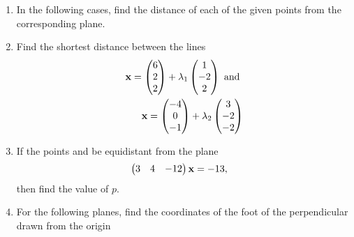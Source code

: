 \documentclass[journal,12pt,twocolumn]{IEEEtran}
\renewcommand\thesection{\arabic{section}}
\begin{document}
\begin{enumerate}[label=\thesection.\arabic*.,ref=\thesection.\theenumi]
\item In the following cases, find the distance of each of the given points from the corresponding plane.
\begin{table}[!h]
\centering
%
\caption{}
\label{table:3d}
\end{table}
\item Find the shortest distance between the lines 
%
\begin{align}
\mathbf{x} = \begin{pmatrix}6 \\ 2 \\ 2\end{pmatrix} + \lambda_1 \begin{pmatrix}1 \\ -2 \\ 2\end{pmatrix}  \text{ and }
\\
\mathbf{x} = \begin{pmatrix}-4 \\ 0 \\ -1\end{pmatrix} + \lambda_2 \begin{pmatrix}3 \\ -2 \\ -2\end{pmatrix}  
\end{align}
%
\solution
% 

\item If the points  and  be equidistant from the plane 
\begin{align}
\begin{pmatrix}3 & 4 & -12\end{pmatrix}\mathbf{x}&=-13,
\end{align}
%
then find the value of $p$.
\item  For the following planes, find the coordinates of the foot of the perpendicular drawn from the origin
\begin{enumerate}[itemsep=2pt]
\end{enumerate}


\end{enumerate}
\end{document}
